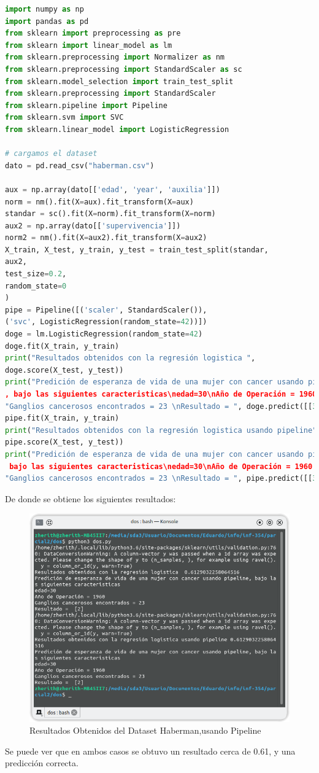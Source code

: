 \begin{lstlisting}[language=python]
import numpy as np
import pandas as pd
from sklearn import preprocessing as pre
from sklearn import linear_model as lm
from sklearn.preprocessing import Normalizer as nm
from sklearn.preprocessing import StandardScaler as sc
from sklearn.model_selection import train_test_split
from sklearn.preprocessing import StandardScaler
from sklearn.pipeline import Pipeline
from sklearn.svm import SVC
from sklearn.linear_model import LogisticRegression

# cargamos el dataset
dato = pd.read_csv("haberman.csv")

aux = np.array(dato[['edad', 'year', 'auxilia']])
norm = nm().fit(X=aux).fit_transform(X=aux)
standar = sc().fit(X=norm).fit_transform(X=norm)
aux2 = np.array(dato[['supervivencia']])
norm2 = nm().fit(X=aux2).fit_transform(X=aux2)
X_train, X_test, y_train, y_test = train_test_split(standar,
aux2,
test_size=0.2,
random_state=0
)
pipe = Pipeline([('scaler', StandardScaler()),
('svc', LogisticRegression(random_state=42))])
doge = lm.LogisticRegression(random_state=42)
doge.fit(X_train, y_train)
print("Resultados obtenidos con la regresión logistica ",
doge.score(X_test, y_test))
print("Predición de esperanza de vida de una mujer con cancer usando pipeline
, bajo las siguientes caracteristicas\nedad=30\nAño de Operación = 1960 ",
"Ganglios cancerosos encontrados = 23 \nResultado = ", doge.predict([[30, 60, 23]]))
pipe.fit(X_train, y_train)
print("Resultados obtenidos con la regresión logistica usando pipeline",
pipe.score(X_test, y_test))
print("Predición de esperanza de vida de una mujer con cancer usando pipeline,
 bajo las siguientes caracteristicas\nedad=30\nAño de Operación = 1960 ",
"Ganglios cancerosos encontrados = 23 \nResultado = ", pipe.predict([[30, 60, 23]]))
\end{lstlisting}
De donde se obtiene los siguientes resultados:
\begin{figure}[H]
	\centering
	\includegraphics[width=0.8\linewidth]{im/uno.png}
	\caption[Resultados Obtenidos del Dataset Haberman, usando Pipeline]{Resultados Obtenidos del Dataset Haberman,usando Pipeline}
\end{figure}
Se puede ver que en ambos casos se obtuvo un resultado cerca de 0.61, y una predicción correcta. 






